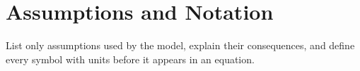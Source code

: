 \section{Assumptions and Notation}

List only assumptions used by the model, explain their consequences, and define
every symbol with units before it appears in an equation.
